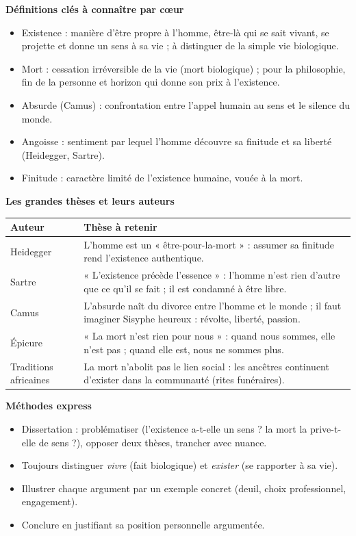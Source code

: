 \documentclass[11pt]{article}
\newcommand{\cle}[1]{{\popxbold\color{popdark}#1}}
\begin{document}
\begin{bilan}
\textbf{Définitions clés à connaître par cœur}
\begin{itemize}
  \item \cle{Existence} : manière d'être propre à l'homme, être-là qui se sait vivant, se projette et donne un sens à sa vie ; à distinguer de la simple vie biologique.
  \item \cle{Mort} : cessation irréversible de la vie (mort biologique) ; pour la philosophie, fin de la personne et horizon qui donne son prix à l'existence.
  \item \cle{Absurde} (Camus) : confrontation entre l'appel humain au sens et le silence du monde.
  \item \cle{Angoisse} : sentiment par lequel l'homme découvre sa finitude et sa liberté (Heidegger, Sartre).
  \item \cle{Finitude} : caractère limité de l'existence humaine, vouée à la mort.
\end{itemize}

\textbf{Les grandes thèses et leurs auteurs}
\begin{center}
\begin{tabularx}{\linewidth}{|l|X|}
\hline
\rowcolor{popblueL}\textbf{Auteur} & \textbf{Thèse à retenir} \\
\hline
Heidegger & L'homme est un « être-pour-la-mort » : assumer sa finitude rend l'existence authentique. \\
\hline
Sartre & « L'existence précède l'essence » : l'homme n'est rien d'autre que ce qu'il se fait ; il est condamné à être libre. \\
\hline
Camus & L'absurde naît du divorce entre l'homme et le monde ; il faut imaginer Sisyphe heureux : révolte, liberté, passion. \\
\hline
Épicure & « La mort n'est rien pour nous » : quand nous sommes, elle n'est pas ; quand elle est, nous ne sommes plus. \\
\hline
Traditions africaines & La mort n'abolit pas le lien social : les ancêtres continuent d'exister dans la communauté (rites funéraires). \\
\hline
\end{tabularx}
\end{center}

\textbf{Méthodes express}
\begin{itemize}
  \item Dissertation : problématiser (l'existence a-t-elle un sens ? la mort la prive-t-elle de sens ?), opposer deux thèses, trancher avec nuance.
  \item Toujours distinguer \emph{vivre} (fait biologique) et \emph{exister} (se rapporter à sa vie).
  \item Illustrer chaque argument par un exemple concret (deuil, choix professionnel, engagement).
  \item Conclure en justifiant sa position personnelle argumentée.
\end{itemize}
\end{bilan}
\end{document}
